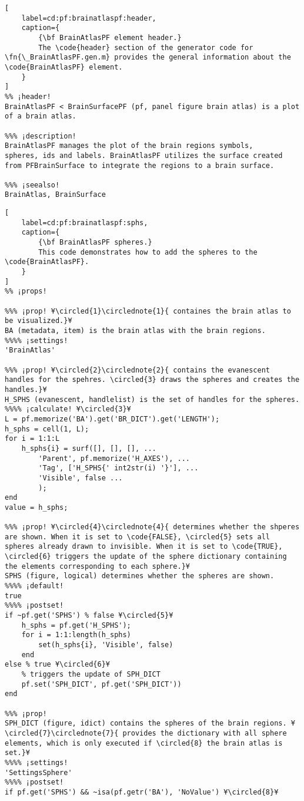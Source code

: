 \documentclass{tufte-handout}
\begin{document}
\begin{lstlisting}[
	label=cd:pf:brainatlaspf:header,
	caption={
		{\bf BrainAtlasPF element header.}
		The \code{header} section of the generator code for \fn{\_BrainAtlasPF.gen.m} provides the general information about the \code{BrainAtlasPF} element.
	}
]
%% ¡header!
BrainAtlasPF < BrainSurfacePF (pf, panel figure brain atlas) is a plot of a brain atlas.

%%% ¡description!
BrainAtlasPF manages the plot of the brain regions symbols,
spheres, ids and labels. BrainAtlasPF utilizes the surface created
from PFBrainSurface to integrate the regions to a brain surface.

%%% ¡seealso!
BrainAtlas, BrainSurface
\end{lstlisting}

\begin{lstlisting}[
	label=cd:pf:brainatlaspf:sphs,
	caption={
		{\bf BrainAtlasPF spheres.}
		This code demonstrates how to add the spheres to the \code{BrainAtlasPF}.
	}
]
%% ¡props!

%%% ¡prop! ¥\circled{1}\circlednote{1}{ containes the brain atlas to be visualized.}¥
BA (metadata, item) is the brain atlas with the brain regions.
%%%% ¡settings!
'BrainAtlas'

%%% ¡prop! ¥\circled{2}\circlednote{2}{ contains the evanescent handles for the spehres. \circled{3} draws the spheres and creates the handles.}¥
H_SPHS (evanescent, handlelist) is the set of handles for the spheres.
%%%% ¡calculate! ¥\circled{3}¥
L = pf.memorize('BA').get('BR_DICT').get('LENGTH');
h_sphs = cell(1, L);
for i = 1:1:L
    h_sphs{i} = surf([], [], [], ...
        'Parent', pf.memorize('H_AXES'), ...
        'Tag', ['H_SPHS{' int2str(i) '}'], ...
        'Visible', false ...
        );
end
value = h_sphs;

%%% ¡prop! ¥\circled{4}\circlednote{4}{ determines whether the shperes are shown. When it is set to \code{FALSE}, \circled{5} sets all spheres already drawn to invisible. When it is set to \code{TRUE}, \circled{6} triggers the update of the sphere dictionary containing the elements corresponding to each sphere.}¥
SPHS (figure, logical) determines whether the spheres are shown.
%%%% ¡default!
true
%%%% ¡postset!
if ~pf.get('SPHS') % false ¥\circled{5}¥
    h_sphs = pf.get('H_SPHS');
    for i = 1:1:length(h_sphs)
        set(h_sphs{i}, 'Visible', false)
    end
else % true ¥\circled{6}¥
    % triggers the update of SPH_DICT
    pf.set('SPH_DICT', pf.get('SPH_DICT'))
end

%%% ¡prop!
SPH_DICT (figure, idict) contains the spheres of the brain regions. ¥\circled{7}\circlednote{7}{ provides the dictionary with all sphere elements, which is only executed if \circled{8} the brain atlas is set.}¥
%%%% ¡settings!
'SettingsSphere'
%%%% ¡postset!
if pf.get('SPHS') && ~isa(pf.getr('BA'), 'NoValue') ¥\circled{8}¥
    

\end{lstlisting}
\end{document}
